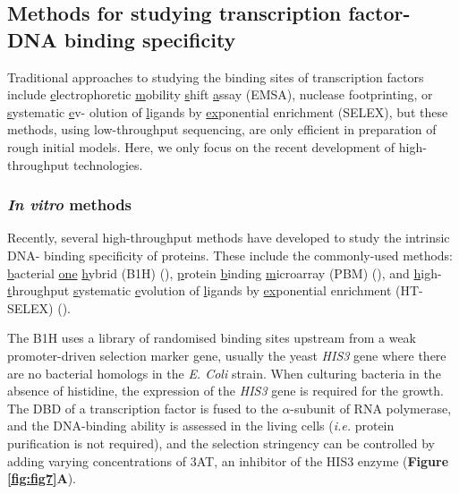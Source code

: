 \subsection{Methods for studying transcription factor-DNA binding specificity} \label{section:tech}

Traditional approaches to studying the binding sites of transcription factors include
\underline{e}lectrophoretic \underline{m}obility \underline{s}hift \underline{a}ssay (EMSA), nuclease footprinting, or \underline{s}ystematic \underline{e}v- olution of \underline{l}igands by \underline{ex}ponential enrichment (SELEX), but these methods, using low-throughput sequencing, are only efficient in preparation of rough initial models. Here, we only focus on the recent development of high-throughput technologies.

\subsubsection{\textit{In vitro} methods}

Recently, several high-throughput methods have developed to study the intrinsic DNA- binding specificity of proteins. These include the commonly-used methods: \underline{b}acterial \underline{one} \underline{h}ybrid (B1H) (\cite{meng2005a}), \underline{p}rotein \underline{b}inding \underline{m}icroarray (PBM) (\cite{bulyk1999quantifying}), and \underline{h}igh-\underline{t}hroughput \underline{s}ystematic \underline{e}volution of \underline{l}igands by \underline{ex}ponential enrichment (HT-SELEX) (\cite{jolma2010multiplexed}).

The B1H uses a library of randomised binding sites upstream from a weak promoter-driven selection marker gene, usually the yeast \textit{HIS3} gene where there are no bacterial homologs in the \textit{E. Coli} strain. When culturing bacteria in the absence of histidine, the expression of the \textit{HIS3} gene is required for the growth. The DBD of a transcription factor is fused to the $\alpha$-subunit of RNA polymerase, and the DNA-binding ability is assessed in the living cells (\textit{i.e.} protein purification is not required), and the selection stringency can be controlled by adding varying concentrations of 3AT, an inhibitor of the HIS3 enzyme (\textbf{Figure \ref{fig:fig7}A}).

